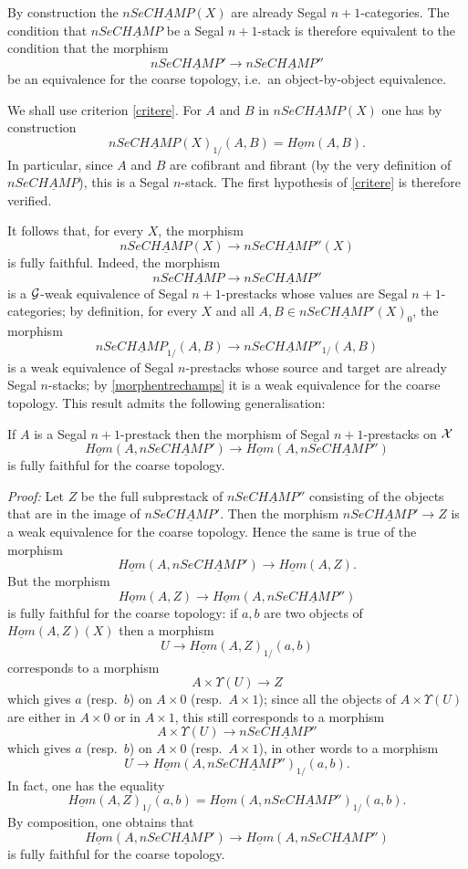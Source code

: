 By construction the $nSe\underline{CHAMP}(X)$ are already
Segal $n+1$-categories. The condition that $nSe\underline{CHAMP}$ be
a Segal $n+1$-stack is therefore equivalent to the condition that the morphism
$$
nSe\underline{CHAMP}'\rightarrow nSe\underline{CHAMP}''
$$
be an equivalence for the coarse topology, i.e.\ an
object-by-object equivalence.

We shall use criterion \ref{critere}.
For $A$ and $B$ in $nSe\underline{CHAMP}(X)$
one has by construction
$$
nSe\underline{CHAMP}(X)_{1/} (A,B) = \underline{Hom}(A,B).
$$
In particular, since $A$ and $B$ are cofibrant and fibrant (by
the very definition of $nSe\underline{CHAMP}$), this is a Segal $n$-stack.
The first hypothesis of \ref{critere} is therefore verified.


It follows that, for every $X$, the morphism
$$
nSe\underline{CHAMP}(X)
\rightarrow
nSe\underline{CHAMP}''(X)
$$
is fully faithful. Indeed, the morphism
$$
nSe\underline{CHAMP}
\rightarrow
nSe\underline{CHAMP}''
$$
is a ${\cal G}$-weak equivalence of Segal $n+1$-prestacks whose values are Segal
$n+1$-categories; by definition, for every $X$ and all
$A,B\in nSe\underline{CHAMP}'(X)_0$, the morphism
$$
nSe\underline{CHAMP}_{1/}(A,B)
\rightarrow
nSe\underline{CHAMP}''_{1/}(A,B)
$$
is a weak equivalence of Segal $n$-prestacks whose
source and target
are already Segal $n$-stacks; by \ref{morphentrechamps}
it is a weak equivalence for the coarse topology.
This result admits the following generalisation:

\begin{lemma}
\label{hompleinfidele}
If $A$ is a Segal $n+1$-prestack then the morphism of
Segal $n+1$-prestacks on ${\cal X}$
$$
\underline{Hom}(A, nSe\underline{CHAMP}')\rightarrow
\underline{Hom}(A,nSe\underline{CHAMP}'')
$$
is fully faithful for the coarse topology.
\end{lemma}
{\em Proof:}
Let $Z$ be the full subprestack of $nSe\underline{CHAMP}''$
consisting of the objects that are in the image of $nSe\underline{CHAMP}'$.
Then the morphism
$nSe\underline{CHAMP}'\rightarrow Z$ is a weak equivalence for the
coarse topology. Hence the same is true of the morphism
$$
\underline{Hom}(A, nSe\underline{CHAMP}')\rightarrow
\underline{Hom}(A, Z).
$$
But the morphism
$$
\underline{Hom}(A, Z)\rightarrow
\underline{Hom}(A, nSe\underline{CHAMP}'')
$$
is fully faithful for the coarse topology: if $a,b$ are
two objects of $\underline{Hom}(A, Z)(X)$ then a morphism
$$
U\rightarrow \underline{Hom}(A, Z)_{1/}(a,b)
$$
corresponds to a morphism
$$
A\times \Upsilon (U)\rightarrow Z
$$
which gives $a$ (resp.\ $b$) on $A\times 0$ (resp.\ $A\times 1$);
since all the objects of $A\times \Upsilon (U)$ are either in
$A\times 0$ or in $A\times 1$, this
still corresponds to a morphism
$$
A\times \Upsilon (U)\rightarrow nSe\underline{CHAMP}''
$$
which gives $a$ (resp.\ $b$) on $A\times 0$ (resp.\ $A\times 1$),
in other words to a morphism
$$
U\rightarrow \underline{Hom}(A, nSe\underline{CHAMP}'')_{1/}(a,b).
$$
In fact, one has the equality
$$
\underline{Hom}(A, Z)_{1/}(a,b)  =
\underline{Hom}(A, nSe\underline{CHAMP}'')_{1/}(a,b).
$$
By composition, one obtains that
$$
\underline{Hom}(A, nSe\underline{CHAMP}')\rightarrow
\underline{Hom}(A, nSe\underline{CHAMP}'')
$$
is fully faithful for the coarse topology.
\eop


